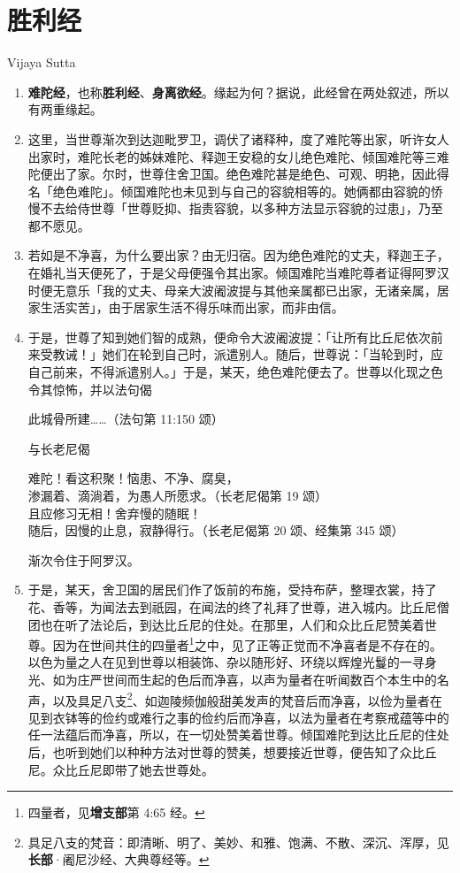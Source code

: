 \section{胜利经}

\begin{center}Vijaya Sutta\end{center}\vspace{1em}

\begin{enumerate}\item \textbf{难陀经}，也称\textbf{胜利经}、\textbf{身离欲经}。缘起为何？据说，此经曾在两处叙述，所以有两重缘起。
\item 这里，当世尊渐次到达迦毗罗卫，调伏了诸释种，度了难陀等出家，听许女人出家时，难陀长老的姊妹难陀、释迦王安稳的女儿绝色难陀、倾国难陀等三难陀便出了家。尔时，世尊住舍卫国。绝色难陀甚是绝色、可观、明艳，因此得名「绝色难陀」。倾国难陀也未见到与自己的容貌相等的。她俩都由容貌的㤭慢不去给侍世尊「世尊贬抑、指责容貌，以多种方法显示容貌的过患」，乃至都不愿见。
\item 若如是不净喜，为什么要出家？由无归宿。因为绝色难陀的丈夫，释迦王子，在婚礼当天便死了，于是父母便强令其出家。倾国难陀当难陀尊者证得阿罗汉时便无意乐「我的丈夫、母亲大波阇波提与其他亲属都已出家，无诸亲属，居家生活实苦」，由于居家生活不得乐味而出家，而非由信。
\item 于是，世尊了知到她们智的成熟，便命令大波阇波提：「让所有比丘尼依次前来受教诫！」她们在轮到自己时，派遣别人。随后，世尊说：「当轮到时，应自己前来，不得派遣别人。」于是，某天，绝色难陀便去了。世尊以化现之色令其惊怖，并以法句偈\begin{quoting}此城骨所建……（法句第 11:150 颂）\end{quoting}与长老尼偈\begin{quoting}难陀！看这积聚！恼患、不净、腐臭，\\渗漏着、滴淌着，为愚人所愿求。（长老尼偈第 19 颂）\\且应修习无相！舍弃慢的随眠！\\随后，因慢的止息，寂静得行。（长老尼偈第 20 颂、经集第 345 颂）\end{quoting}渐次令住于阿罗汉。
\item 于是，某天，舍卫国的居民们作了饭前的布施，受持布萨，整理衣裳，持了花、香等，为闻法去到祇园，在闻法的终了礼拜了世尊，进入城内。比丘尼僧团也在听了法论后，到达比丘尼的住处。在那里，人们和众比丘尼赞美着世尊。因为在世间共住的四量者\footnote{四量者，见\textbf{增支部}第 4:65 经。}之中，见了正等正觉而不净喜者是不存在的。以色为量之人在见到世尊以相装饰、杂以随形好、环绕以辉煌光鬘的一寻身光、如为庄严世间而生起的色后而净喜，以声为量者在听闻数百个本生中的名声，以及具足八支\footnote{具足八支的梵音：即清晰、明了、美妙、和雅、饱满、不散、深沉、浑厚，见\textbf{长部}·阇尼沙经、大典尊经等。}、如迦陵频伽般甜美发声的梵音后而净喜，以俭为量者在见到衣钵等的俭约或难行之事的俭约后而净喜，以法为量者在考察戒蕴等中的任一法蕴后而净喜，所以，在一切处赞美着世尊。倾国难陀到达比丘尼的住处后，也听到她们以种种方法对世尊的赞美，想要接近世尊，便告知了众比丘尼。众比丘尼即带了她去世尊处。

\end{enumerate}
